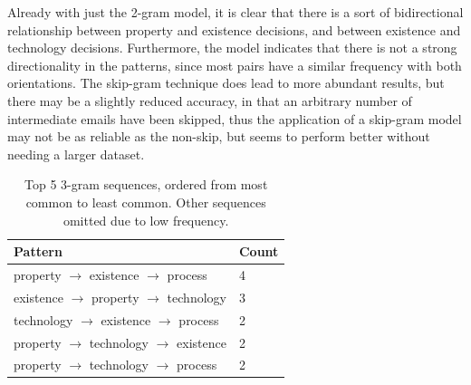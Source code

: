 \documentclass[a4paper, 12pt]{article}
\begin{document}
		Already with just the 2-gram model, it is clear that there is a sort of bidirectional relationship between property and existence decisions, and between existence and technology decisions. Furthermore, the model indicates that there is not a strong directionality in the patterns, since most pairs have a similar frequency with both orientations. The skip-gram technique does lead to more abundant results, but there may be a slightly reduced accuracy\cite{guthrie}, in that an arbitrary number of intermediate emails have been skipped, thus the application of a skip-gram model may not be as reliable as the non-skip, but seems to perform better without needing a larger dataset.
	
		\begin{table}[H]
			\centering
			\caption{Top 5 3-gram sequences, ordered from most common to least common. Other sequences omitted due to low frequency.}
			\begin{tabular}{|l|l|}
				\hline
				\textbf{Pattern} & \textbf{Count} \\ \hline
				property $ \rightarrow $ existence $ \rightarrow $ process & 4 \\ \hline
				existence $ \rightarrow $ property $ \rightarrow $ technology & 3 \\ \hline
				technology $ \rightarrow $ existence $ \rightarrow $ process & 2 \\ \hline
				property $ \rightarrow $ technology $ \rightarrow $ existence & 2 \\ \hline
				property $ \rightarrow $ technology $ \rightarrow $ process & 2 \\ \hline
			\end{tabular}
		\end{table}
		
\end{document}
